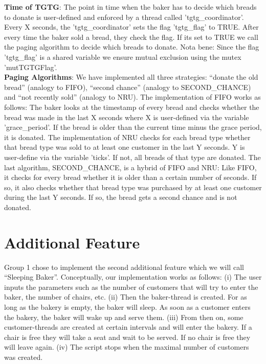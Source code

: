 \documentclass[11pt]{article}
\begin{document}
\textbf{Time of TGTG}: The point in time when the baker has to decide which breads to donate is user-defined and enforced by a thread called 'tgtg\_coordinator'. Every X seconds, the 'tgtg\_coordinator' sets the flag 'tgtg\_flag' to TRUE. After every time the baker sold a bread, they check the flag. If its set to TRUE we call the paging algorithm to decide which breads to donate. Nota bene: Since the flag 'tgtg\_flag' is a shared variable we ensure mutual exclusion using the mutex 'mutTGTGFlag'.\\

\textbf{Paging Algorithms}: We have implemented all three strategies: ``donate the old bread'' (analogy to FIFO), ``second chance'' (analogy to SECOND\_CHANCE) and ``not recently sold'' (analogy to NRU). The implementation of FIFO works as follows: The baker looks at the timestamp of every bread and checks whether the bread was made in the last X seconds where X is user-defined via the variable 'grace\_period'. If the bread is older than the current time minus the grace period, it is donated. The implementation of NRU checks for each bread type whether that bread type was sold to at least one customer in the last Y seconds. Y is user-define via the variable 'ticks'. If not, all breads of that type are donated. The last algorithm, SECOND\_CHANCE, is a hybrid of FIFO and NRU: Like FIFO, it checks for every bread whether it is older than a certain number of seconds. If so, it also checks whether that bread type was purchased by at least one customer during the last Y seconds. If so, the bread gets a second chance and is not donated.\\

\section{Additional Feature}
\label{sec:orgd6758b9}

Group 1 chose to implement the second additional feature which we will call ``Sleeping Baker''. Conceptually, our implementation works as follows: (i) The user inputs the parameters such as the number of customers that will try to enter the baker, the number of chairs, etc. (ii) Then the baker-thread is created. For as long as the bakery is empty, the baker will sleep. As soon as a customer enters the bakery, the baker will wake up and serve them. (iii) From then on, some customer-threads are created at certain intervals and will enter the bakery. If a chair is free they will take a seat and wait to be served. If no chair is free they will leave again. (iv) The script stops when the maximal number of customers was created.\\
\end{document}
